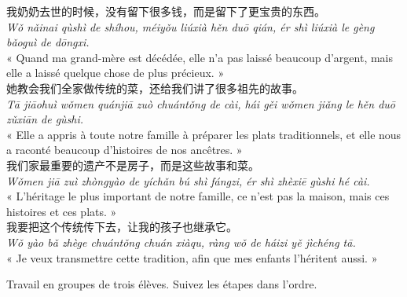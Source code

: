 \documentclass[11pt]{article}
\newcounter{popsec}
\newcounter{popsub}
\newcommand{\courssub}[1]{%
  \stepcounter{popsub}%
  \par\vspace{9pt}\noindent{\popxbold\fontsize{11.5}{13}\selectfont\color{popink}{\color{poporange}\thepopsec.\thepopsub}\hspace{6pt}#1}\par\nopagebreak\vspace{4pt}
}
\begin{document}
\begin{textebox}
我奶奶去世的时候，没有留下很多钱，而是留下了更宝贵的东西。\\
\emph{Wǒ nǎinai qùshì de shíhou, méiyǒu liúxià hěn duō qián, ér shì liúxià le gèng bǎoguì de dōngxi.}\\
« Quand ma grand-mère est décédée, elle n'a pas laissé beaucoup d'argent, mais elle a laissé quelque chose de plus précieux. »\\[4pt]
她教会我们全家做传统的菜，还给我们讲了很多祖先的故事。\\
\emph{Tā jiāohuì wǒmen quánjiā zuò chuántǒng de cài, hái gěi wǒmen jiǎng le hěn duō zǔxiān de gùshi.}\\
« Elle a appris à toute notre famille à préparer les plats traditionnels, et elle nous a raconté beaucoup d'histoires de nos ancêtres. »\\[4pt]
我们家最重要的遗产不是房子，而是这些故事和菜。\\
\emph{Wǒmen jiā zuì zhòngyào de yíchǎn bú shì fángzi, ér shì zhèxiē gùshi hé cài.}\\
« L'héritage le plus important de notre famille, ce n'est pas la maison, mais ces histoires et ces plats. »\\[4pt]
我要把这个传统传下去，让我的孩子也继承它。\\
\emph{Wǒ yào bǎ zhège chuántǒng chuán xiàqu, ràng wǒ de háizi yě jìchéng tā.}\\
« Je veux transmettre cette tradition, afin que mes enfants l'héritent aussi. »
\end{textebox}

\courssub{Consignes}

Travail en groupes de trois élèves. Suivez les étapes dans l'ordre.
\end{document}
